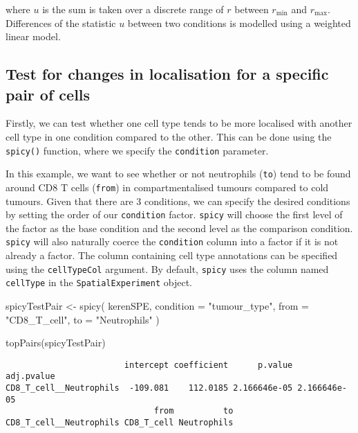 \documentclass[
  letterpaper,
  DIV=11,
  numbers=noendperiod]{scrreprt}
\newenvironment{Shaded}{\begin{snugshade}}{\end{snugshade}}
\newcommand{\AttributeTok}[1]{\textcolor[rgb]{0.40,0.45,0.13}{#1}}
\newcommand{\FunctionTok}[1]{\textcolor[rgb]{0.28,0.35,0.67}{#1}}
\newcommand{\NormalTok}[1]{\textcolor[rgb]{0.00,0.23,0.31}{#1}}
\newcommand{\OtherTok}[1]{\textcolor[rgb]{0.00,0.23,0.31}{#1}}
\newcommand{\StringTok}[1]{\textcolor[rgb]{0.13,0.47,0.30}{#1}}
\begin{document}
where \(u\) is the sum is taken over a discrete range of \(r\) between
\(r_{\text{min}}\) and \(r_{\text{max}}\). Differences of the statistic
\(u\) between two conditions is modelled using a weighted linear model.

\subsection{Test for changes in localisation for a specific pair of
cells}\label{test-for-changes-in-localisation-for-a-specific-pair-of-cells}

Firstly, we can test whether one cell type tends to be more localised
with another cell type in one condition compared to the other. This can
be done using the \texttt{spicy()} function, where we specify the
\texttt{condition} parameter.

In this example, we want to see whether or not neutrophils (\texttt{to})
tend to be found around CD8 T cells (\texttt{from}) in compartmentalised
tumours compared to cold tumours. Given that there are 3 conditions, we
can specify the desired conditions by setting the order of our
\texttt{condition} factor. \texttt{spicy} will choose the first level of
the factor as the base condition and the second level as the comparison
condition. \texttt{spicy} will also naturally coerce the
\texttt{condition} column into a factor if it is not already a factor.
The column containing cell type annotations can be specified using the
\texttt{cellTypeCol} argument. By default, \texttt{spicy} uses the
column named \texttt{cellType} in the \texttt{SpatialExperiment} object.

\begin{Shaded}
\begin{Highlighting}[]
\NormalTok{spicyTestPair }\OtherTok{\textless{}{-}} \FunctionTok{spicy}\NormalTok{(}
\NormalTok{  kerenSPE,}
  \AttributeTok{condition =} \StringTok{"tumour\_type"}\NormalTok{,}
  \AttributeTok{from =} \StringTok{"CD8\_T\_cell"}\NormalTok{,}
  \AttributeTok{to =} \StringTok{"Neutrophils"}
\NormalTok{)}

\FunctionTok{topPairs}\NormalTok{(spicyTestPair)}
\end{Highlighting}
\end{Shaded}

\begin{verbatim}
                        intercept coefficient      p.value   adj.pvalue
CD8_T_cell__Neutrophils  -109.081    112.0185 2.166646e-05 2.166646e-05
                              from          to
CD8_T_cell__Neutrophils CD8_T_cell Neutrophils
\end{verbatim}
\end{document}
